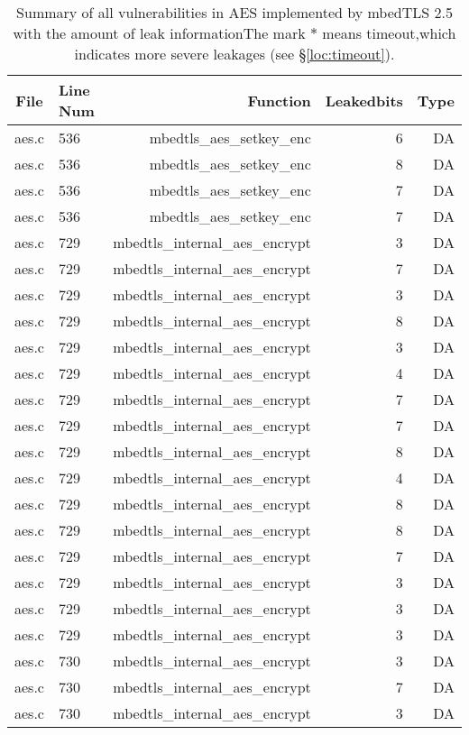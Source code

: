 \begin{table*}%
\centering
\caption{Summary of all vulnerabilities in AES implemented by mbedTLS 2.5 with the amount of leak informationThe mark $*$ means timeout,which indicates more severe leakages (see \S\ref{loc:timeout}).}\label{tab:AESmbedTLS}
\begin{tabular}{clrrr}
\hline
\textbf{File} & \textbf{Line Num} & \textbf{Function} & \textbf{Leakedbits} & \textbf{Type} \\\hline
aes.c& 536&mbedtls\_aes\_setkey\_enc&6 &DA\\
aes.c& 536&mbedtls\_aes\_setkey\_enc&8 &DA\\
aes.c& 536&mbedtls\_aes\_setkey\_enc&7 &DA\\
aes.c& 536&mbedtls\_aes\_setkey\_enc&7 &DA\\
aes.c& 729&mbedtls\_internal\_aes\_encrypt&3 &DA\\
aes.c& 729&mbedtls\_internal\_aes\_encrypt&7 &DA\\
aes.c& 729&mbedtls\_internal\_aes\_encrypt&3 &DA\\
aes.c& 729&mbedtls\_internal\_aes\_encrypt&8 &DA\\
aes.c& 729&mbedtls\_internal\_aes\_encrypt&3 &DA\\
aes.c& 729&mbedtls\_internal\_aes\_encrypt&4 &DA\\
aes.c& 729&mbedtls\_internal\_aes\_encrypt&7 &DA\\
aes.c& 729&mbedtls\_internal\_aes\_encrypt&7 &DA\\
aes.c& 729&mbedtls\_internal\_aes\_encrypt&8 &DA\\
aes.c& 729&mbedtls\_internal\_aes\_encrypt&4 &DA\\
aes.c& 729&mbedtls\_internal\_aes\_encrypt&8 &DA\\
aes.c& 729&mbedtls\_internal\_aes\_encrypt&8 &DA\\
aes.c& 729&mbedtls\_internal\_aes\_encrypt&7 &DA\\
aes.c& 729&mbedtls\_internal\_aes\_encrypt&3 &DA\\
aes.c& 729&mbedtls\_internal\_aes\_encrypt&3 &DA\\
aes.c& 729&mbedtls\_internal\_aes\_encrypt&3 &DA\\
aes.c& 730&mbedtls\_internal\_aes\_encrypt&3 &DA\\
aes.c& 730&mbedtls\_internal\_aes\_encrypt&7 &DA\\
aes.c& 730&mbedtls\_internal\_aes\_encrypt&3 &DA\\

\end{tabular}
\end{table*}
